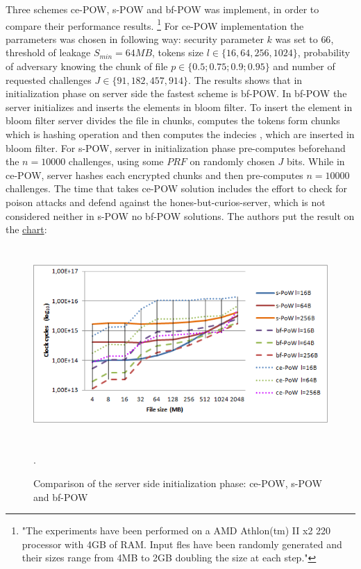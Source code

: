 \documentclass[12pt]{article}
\begin{document}
Three schemes ce-POW, s-POW and bf-POW was implement, in order to compare their performance results. \footnote{"The experiments have been performed on a AMD Athlon(tm) II x2 220
processor with 4GB of RAM. Input fles have been randomly generated and their sizes range from 4MB to 2GB doubling the size at each step."} For ce-POW implementation the parrameters was chosen in following way: security parameter $k$ was set to $66$, threshold of leakage $S_{min} = 64MB$, tokens size $l \in \{16, 64, 256,1024\} $, probability of adversary knowing the  chunk of file $p \in \{0.5; 0.75; 0.9; 0.95\}$ and number of requested challenges $J \in \{91, 182, 457, 914\}$.
The results shows that in initialization phase on server side the fastest scheme is bf-POW. In bf-POW the server initializes and inserts the elements in bloom filter. To insert the element in bloom filter server divides the file in chunks, computes the tokens form chunks which is hashing operation and then computes the indecies , which are inserted  in bloom filter. For s-POW, server in initialization phase pre-computes beforehand the $n=10000$ challenges, using some $PRF$ on randomly chosen $J$ bits. While in ce-POW, server hashes each encrypted chunks and then pre-computes $n=10000$ challenges. The time that takes ce-POW solution includes the effort to check for poison attacks and defend against the hones-but-curios-server, which is not considered neither in s-POW no  bf-POW solutions. The authors put the result on the \hyperref[fig:ce-POW]{chart}:

\begin{figure}[ht] 
\begin{center}
\includegraphics[height=210pt,width=400pt]{ce-POW}
\caption{Comparison of the server side initialization phase: ce-POW, s-POW and bf-POW}
\label{fig:ce-POW} .
\end{center}
\end{figure}
\end{document}
